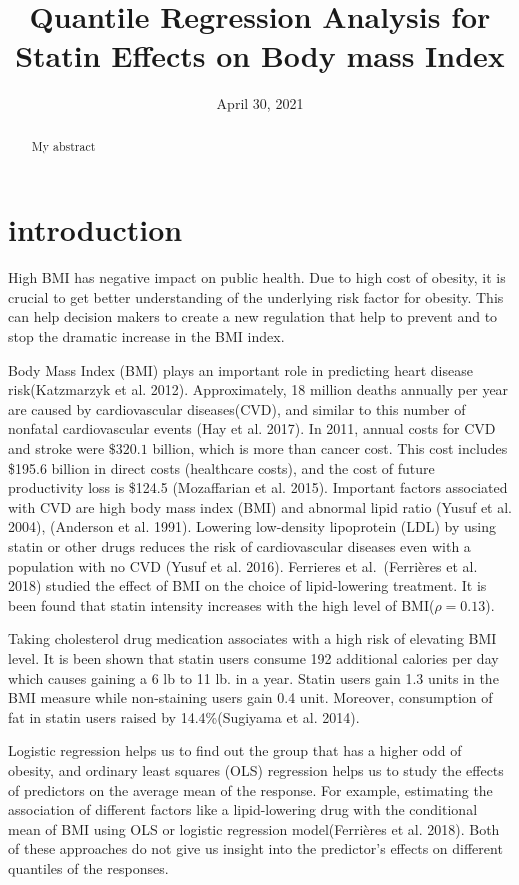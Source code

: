 \documentclass[
  12pt,
]{article}
\title{Quantile Regression Analysis for Statin Effects on Body mass Index}
\author{}
\date{\vspace{-2.5em}April 30, 2021}
\begin{document}
\maketitle
\begin{abstract}
My abstract
\end{abstract}

{
\setcounter{tocdepth}{2}
\tableofcontents
}
\section{introduction}

High BMI has negative impact on public health. Due to high cost of obesity, it is crucial to get better understanding of the underlying risk factor for obesity. This can help decision makers to create a new regulation that help to prevent and to stop the dramatic increase in the BMI index.

Body Mass Index (BMI) plays an important role in predicting heart disease risk(Katzmarzyk et al. 2012). Approximately, 18 million deaths annually per year are caused by cardiovascular diseases(CVD), and similar to this number of nonfatal cardiovascular events (Hay et al. 2017).
In 2011, annual costs for CVD and stroke were \(\$320.1\) billion, which is more than cancer cost. This cost includes \$195.6 billion in direct costs (healthcare costs), and the cost of future productivity loss is \$124.5 (Mozaffarian et al. 2015). Important factors associated with CVD are high body mass index (BMI) and abnormal lipid ratio (Yusuf et al. 2004), (Anderson et al. 1991). Lowering low-density lipoprotein (LDL) by using statin or other drugs reduces the risk of cardiovascular diseases even with a population with no CVD (Yusuf et al. 2016). Ferrieres et al.~(Ferrières et al. 2018) studied the effect of BMI on the choice of lipid-lowering treatment. It is been found that statin intensity increases with the high level of BMI(\(\rho=0.13\)).

Taking cholesterol drug medication associates with a high risk of elevating BMI level. It is been shown that statin users consume 192 additional calories per day which causes gaining a 6 lb to 11 lb. in a year. Statin users gain 1.3 units in the BMI measure while non-staining users gain 0.4 unit. Moreover, consumption of fat in statin users raised by 14.4\%(Sugiyama et al. 2014).

Logistic regression helps us to find out the group that has a higher odd of obesity, and ordinary least squares (OLS) regression helps us to study the effects of predictors on the average mean of the response. For example, estimating the association of different factors like a lipid-lowering drug with the conditional mean of BMI using OLS or logistic regression model(Ferrières et al. 2018). Both of these approaches do not give us insight into the predictor's effects on different quantiles of the responses.
\end{document}
